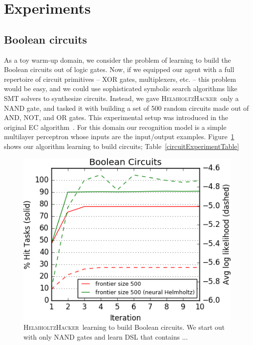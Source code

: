 \documentclass{article}
\newcommand{\system}{\textsc{HelmholtzHacker}~}
\begin{document}
\section{Experiments}

\subsection{Boolean circuits}
As a toy warm-up domain, we consider the problem of learning
to build the Boolean circuits out of logic gates.
Now, if we equipped our agent with a full repertoire of
circuit primitives -- XOR gates, multiplexers, etc. -- this problem would be easy,
and we could use sophisticated symbolic search algorithms like SMT solvers to synthesize circuits.
Instead, we gave \system only a NAND gate,
and tasked it with building a set of 500 random circuits made out of
AND, NOT, and OR gates.
This experimental setup was introduced in the original EC algorithm~\cite{Dechter:2013:BLV:2540128.2540316}.
For this domain our recognition model is a simple multilayer perceptron
whose inputs are the input/output examples.
Figure~\ref{circuitLearningCurve} shows our algorithm learning to build circuits; Table~\ref{circuitExperimentTable} 


\begin{figure}
  \includegraphics[width = \columnwidth]{figures/circuit.png}
  \caption{\system learning to build Boolean circuits. We start out with only NAND gates and learn DSL that contains ...}\label{circuitLearningCurve}
\end{figure}
\end{document}
